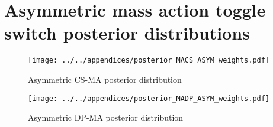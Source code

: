 \section{Asymmetric mass action toggle switch posterior distributions}



\begin{figure*}[htbp]
	\centerfloat
	\texttt{[image: ../../appendices/posterior\_MACS\_ASYM\_weights.pdf]}
	\caption[Asymmetric CS-MA posterior distribution]{Asymmetric CS-MA posterior distribution}
	\label{fig:apend_cs_post_asym}
\end{figure*}

\begin{figure*}[htbp]
	\centerfloat
	\texttt{[image: ../../appendices/posterior\_MADP\_ASYM\_weights.pdf]}
	\caption[Asymmetric DP-MA posterior distribution]{Asymmetric DP-MA posterior distribution}
	\label{fig:apend_dp_post_asym}
\end{figure*}
\clearpage